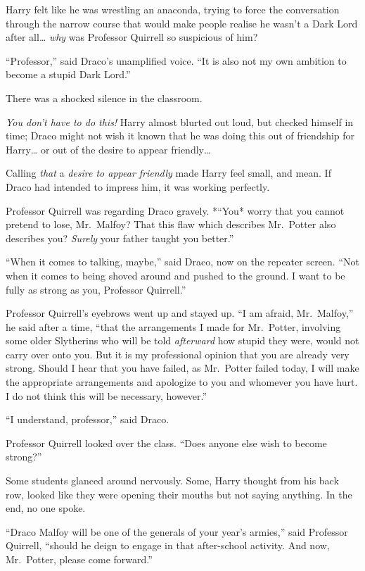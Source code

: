 Harry felt like he was wrestling an anaconda, trying to force the
conversation through the narrow course that would make people realise he
wasn't a Dark Lord after all\ldots{} \emph{why} was Professor Quirrell
so suspicious of him?

``Professor,'' said Draco's unamplified voice. ``It is also not my own
ambition to become a stupid Dark Lord.''

There was a shocked silence in the classroom.

\emph{You don't have to do this!} Harry almost blurted out loud, but
checked himself in time; Draco might not wish it known that he was doing
this out of friendship for Harry\ldots{} or out of the desire to appear
friendly\ldots{}

Calling \emph{that} a \emph{desire to appear friendly} made Harry feel
small, and mean. If Draco had intended to impress him, it was working
perfectly.

Professor Quirrell was regarding Draco gravely. *``You* worry that you
cannot pretend to lose, Mr.~Malfoy? That this flaw which describes
Mr.~Potter also describes you? \emph{Surely} your father taught you
better.''

``When it comes to talking, maybe,'' said Draco, now on the repeater
screen. ``Not when it comes to being shoved around and pushed to the
ground. I want to be fully as strong as you, Professor Quirrell.''

Professor Quirrell's eyebrows went up and stayed up. ``I am afraid,
Mr.~Malfoy,'' he said after a time, ``that the arrangements I made for
Mr.~Potter, involving some older Slytherins who will be told
\emph{afterward} how stupid they were, would not carry over onto you.
But it is my professional opinion that you are already very strong.
Should I hear that you have failed, as Mr.~Potter failed today, I will
make the appropriate arrangements and apologize to you and whomever you
have hurt. I do not think this will be necessary, however.''

``I understand, professor,'' said Draco.

Professor Quirrell looked over the class. ``Does anyone else wish to
become strong?''

Some students glanced around nervously. Some, Harry thought from his
back row, looked like they were opening their mouths but not saying
anything. In the end, no one spoke.

``Draco Malfoy will be one of the generals of your year's armies,'' said
Professor Quirrell, ``should he deign to engage in that after-school
activity. And now, Mr.~Potter, please come forward.''

